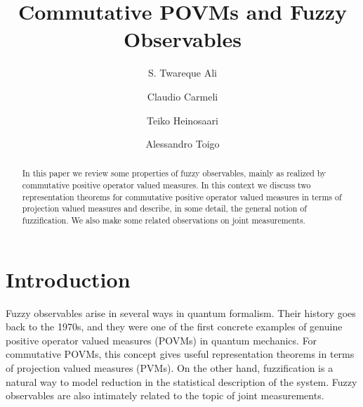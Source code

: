 \documentclass[12pt]{amsart}
\theoremstyle{definition}
\begin{document}
\title[]{Commutative POVMs and Fuzzy Observables}

\author[Ali]{S. Twareque Ali}
\address{S. Twareque Ali, Department of Mathematics and Statistics,
Concordia University, Montreal, Quebec, Canada H3G 1M8}

\author[Carmeli]{Claudio Carmeli}
\address{Claudio Carmeli, Dipartimento di Fisica, Universit\`a di Genova
and I.N.F.N., Sezione di Genova, Via Dodecaneso 33, 16146 Genova, Italy}

\author[Heinosaari]{Teiko Heinosaari}
\address{Teiko Heinosaari, Niels Bohr Institute, Copenhagen University,
Denmark and Department of Physics, University of Turku, Finland}

\author[Toigo]{Alessandro Toigo}
\address{Alessandro Toigo, Dipartimento di Informatica, Universit\`a di Genova,
Via Dodecaneso 35  and I.N.F.N., Sezione di Genova, Via Dodecaneso 33,
16146 Genova, Italy}

\begin{abstract}
In this paper we review some properties of fuzzy observables, mainly as
realized by commutative positive operator valued measures. In this context
we discuss two representation theorems for commutative positive operator
valued measures in terms of projection valued measures and describe, in some
detail, the general notion of fuzzification. We also make some related observations
on joint measurements.
\end{abstract}





\maketitle


\section{Introduction}


Fuzzy observables arise in several ways in quantum formalism.
Their history goes back to the 1970s, and they were one of the first concrete examples
of genuine positive operator valued measures (POVMs) in quantum mechanics.
For commutative POVMs, this concept gives useful representation theorems in terms
of projection valued measures (PVMs). On the other hand, fuzzification is a natural
way to model reduction in the statistical description of the system.  Fuzzy observables
are also intimately related to the topic of joint measurements.
\end{document}
